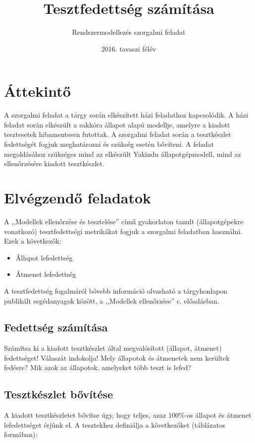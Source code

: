 \documentclass[a4paper]{article}
\title{Tesztfedettség számítása}
\author{Rendszermodellezés szorgalmi feladat}
\date{2016. tavaszi félév}
\begin{document}
	
\maketitle

\section{Áttekintő}

A szorgalmi feladat a tárgy során elkészített házi feladathoz kapcsolódik. A házi feladat során elkészült
a sakkóra állapot alapú modellje, amelyre a kiadott tesztesetek hibamentesen futottak. 
A szorgalmi feladat során a tesztkészlet fedettségét fogjuk meghatározni és szükség esetén bővíteni.
A feladat megoldásához szükséges mind az elkészült Yakindu állapotgépmodell, 
mind az ellenőrzésére kiadott tesztkészlet.

\section{Elvégzendő feladatok}

A ,,Modellek ellenőrzése és tesztelése'' című gyakorlaton tanult (állapotgépekre vonatkozó) tesztfedettségi metrikákat fogjuk a szorgalmi feladatban használni. Ezek a következők:

\begin{itemize}
	\item Állapot lefedettség
	\item Átmenet lefedettség
\end{itemize}

A tesztfedettség fogalmáról bővebb információ olvasható a tárgyhonlapon publikált segédanyagok között, a ,,Modellek ellenőrzése'' c. előadásban.

\subsection{Fedettség számítása}
Számítsa ki a kiadott tesztkészlet által megvalósított (állapot, átmenet) fedettséget! Válaszát indokolja! Mely állapotok 
és átmenetek nem kerültek fedésre? Mik azok az állapotok, amelyeket több teszt is lefed?

\subsection{Tesztkészlet bővítése}
A kiadott tesztkészletet bővítse úgy, hogy teljes, azaz 100\%-os állapot és átmenet lefedettséget érjünk el. A tesztekhez definiálja a következőket (táblázatos formában):
\end{document}
